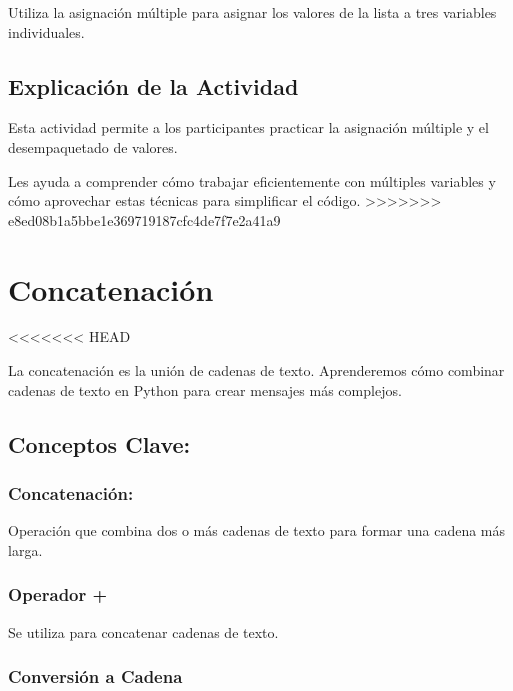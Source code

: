 \documentclass[
  a4paper,
  DIV=11,
  numbers=noendperiod,
  onepage,
  openany]{scrreprt}
\begin{document}
Utiliza la asignación múltiple para asignar los valores de la lista a
tres variables individuales.

\hypertarget{explicaciuxf3n-de-la-actividad-11}{%
\section{Explicación de la
Actividad}\label{explicaciuxf3n-de-la-actividad-11}}

Esta actividad permite a los participantes practicar la asignación
múltiple y el desempaquetado de valores.

Les ayuda a comprender cómo trabajar eficientemente con múltiples
variables y cómo aprovechar estas técnicas para simplificar el código.
\textgreater\textgreater\textgreater\textgreater\textgreater\textgreater\textgreater{}
e8ed08b1a5bbe1e369719187cfc4de7f7e2a41a9

\hypertarget{concatenaciuxf3n}{%
\chapter{Concatenación}\label{concatenaciuxf3n}}

\textless\textless\textless\textless\textless\textless\textless{} HEAD

La concatenación es la unión de cadenas de texto. Aprenderemos cómo
combinar cadenas de texto en Python para crear mensajes más complejos.

\hypertarget{conceptos-clave-14}{%
\section{Conceptos Clave:}\label{conceptos-clave-14}}

\hypertarget{concatenaciuxf3n-1}{%
\subsection{Concatenación:}\label{concatenaciuxf3n-1}}

Operación que combina dos o más cadenas de texto para formar una cadena
más larga.

\hypertarget{operador}{%
\subsection{Operador +}\label{operador}}

Se utiliza para concatenar cadenas de texto.

\hypertarget{conversiuxf3n-a-cadena}{%
\subsection{Conversión a Cadena}\label{conversiuxf3n-a-cadena}}
\end{document}
